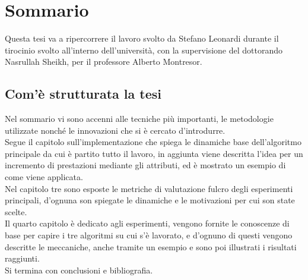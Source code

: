 %
%
%
\chapter{Sommario}
Questa tesi va a ripercorrere il lavoro svolto da Stefano Leonardi durante il tirocinio svolto all'interno dell'università, con la supervisione del dottorando Nasrullah Sheikh, per il professore Alberto Montresor.
%
\section{Com'è strutturata la tesi}
Nel sommario vi sono accenni alle tecniche più importanti, le metodologie utilizzate nonché le innovazioni che si è cercato d'introdurre.\\
Segue il capitolo sull'implementazione che spiega le dinamiche base dell'algoritmo principale da cui è partito tutto il lavoro, in aggiunta viene descritta l'idea per un incremento di prestazioni mediante gli attributi, ed è mostrato un esempio di come viene applicata.\\
Nel capitolo tre sono esposte le metriche di valutazione fulcro degli esperimenti principali, d'ognuna son spiegate le dinamiche e le motivazioni per cui son state scelte.\\
Il quarto capitolo è dedicato agli esperimenti, vengono fornite le conoscenze di base per capire i tre algoritmi su cui s'è lavorato, e d'ognuno di questi vengono descritte le meccaniche, anche tramite un esempio e sono poi illustrati i risultati raggiunti.\\
Si termina con conclusioni e bibliografia.
%
